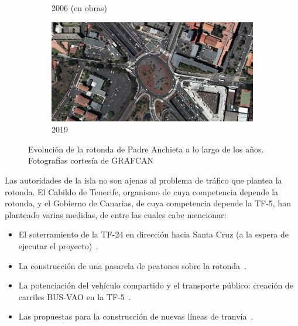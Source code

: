 \begin{figure}[h]
\begin{subfigure}[t]{.49\textwidth}
      \caption{2006 (en obras)}
      \label{fig:anchieta2006}
    \end{subfigure}
    \hfill
    \begin{subfigure}[t]{.49\textwidth}
      \centering
      \includegraphics[width=\textwidth]{report/images/amp-anchieta-2019.png}
      \caption{2019}
      \label{fig:anchieta2019}
    \end{subfigure}
    \caption[Evolución de la rotonda de Padre Anchieta a lo largo de los años.]{Evolución de la rotonda de Padre Anchieta a lo largo de los años. Fotografías cortesía de GRAFCAN\protect\footnotemark}
    \label{fig:anchieta_ev}
\end{figure}


Las autoridades de la isla no son ajenas al problema de tráfico que plantea la rotonda. El Cabildo de Tenerife, organismo de cuya competencia depende la rotonda, y el Gobierno de Canarias, de cuya competencia depende la TF-5, han planteado varias medidas, de entre las cuales cabe mencionar:

\begin{itemize}
    \item El soterramiento de la TF-24 en dirección hacia Santa Cruz (a la espera de ejecutar el proyecto)~\cite{dia_cabildo_2019}.
    \item La construcción de una pasarela de peatones sobre la rotonda~\cite{rozas_pasarela_2019}.
    \item La potenciación del vehículo compartido y el transporte público: creación de carriles BUS-VAO en la TF-5~\cite{20minutos_gobierno_2019}.
    \item Las propuestas para la construcción de nuevas líneas de tranvía~\cite{redaccion_de_eldiarioes_cabildo_2020}.
\end{itemize}

